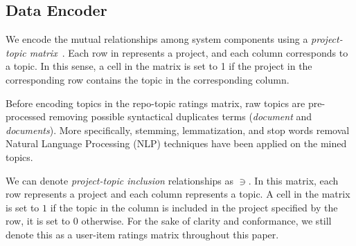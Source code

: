 \subsection{Data Encoder} \label{sec:DataEncoder}


We encode the mutual relationships among system components using a \emph{project-topic matrix}~\cite{Sarwar:2001:ICF:371920.372071}. 
Each row in represents a project, and each column corresponds to a topic. In this sense, a cell in the matrix is set to 1 if the project in the corresponding row contains the topic in the corresponding column.


Before encoding topics in the repo-topic ratings matrix, raw topics are pre-processed removing possible syntactical duplicates terms (\eg \textit{document} and \textit{documents}). More specifically, stemming, lemmatization, and stop words removal Natural Language Processing (NLP) techniques have been applied on the mined topics.


We can denote \emph{project-topic inclusion} relationships as $\ni$. In this matrix, each row represents a project and each column represents a topic. A cell in the matrix is set to $1$ if the topic in the column is included in the project specified by the row, it is set to $0$
otherwise. For the sake of clarity and conformance, we still denote this as a user-item ratings matrix throughout this
paper.

